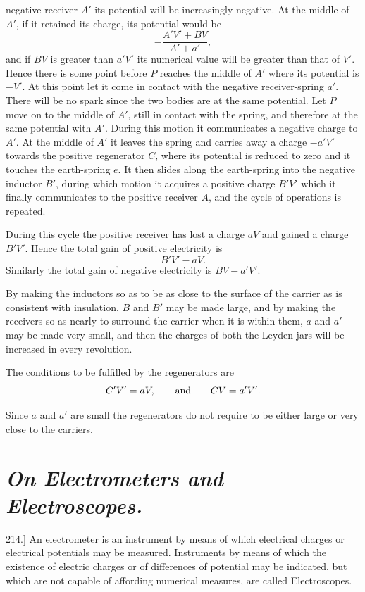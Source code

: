 \documentclass[11pt,a4paper]{article}
\begin{document}
\clearpage

negative receiver $A'$ its potential will be increasingly negative. At
the middle of $A'$, if it retained its charge, its potential would be
\[
-\frac{A'V'+BV}{A'+a'},
\]
and if $BV$ is greater than $a'V'$ its numerical value will be greater
than that of $V'$. Hence there is some point before $P$ reaches the
middle of $A'$ where its potential is $-V'$. At this point let it come
in contact with the negative receiver-spring $a'$. There will be no
spark since the two bodies are at the same potential. Let $P$ move on
to the middle of $A'$, still in contact with the spring, and therefore
at the same potential with $A'$. During this motion it communicates
a negative charge to $A'$. At the middle of $A'$ it leaves the spring
and carries away a charge $-a'V'$ towards the positive regenerator
$C$, where its potential is reduced to zero and it touches the
earth-spring $e$. It then slides along the earth-spring into the negative
inductor $B'$, during which motion it acquires a positive charge
$B'V'$ which it finally communicates to the positive receiver $A$, and
the cycle of operations is repeated.

During this cycle the positive receiver has lost a charge $aV$ and
gained a charge $B'V'$. Hence the total gain of positive electricity is
\[
B'V'-aV.
\]
Similarly the total gain of negative electricity is $BV-a'V'$.

By making the inductors so as to be as close to the surface of
the carrier as is consistent with insulation, $B$ and $B'$ may be made
large, and by making the receivers so as nearly to surround the
carrier when it is within them, $a$ and $a'$ may be made very small,
and then the charges of both the Leyden jars will be increased in
every revolution.

The conditions to be fulfilled by the regenerators are
\[
C'V'=aV,\qquad \hbox{and}\qquad CV=a'V'.
\]

Since $a$ and $a'$ are small the regenerators do not require to be
either large or very close to the carriers.

\section*{\textit{On Electrometers and Electroscopes.}}

214.] An electrometer is an instrument by means of which
electrical charges or electrical potentials may be measured.
Instruments by means of which the existence of electric charges or
of differences of potential may be indicated, but which are not
capable of affording numerical measures, are called Electroscopes.
\end{document}
